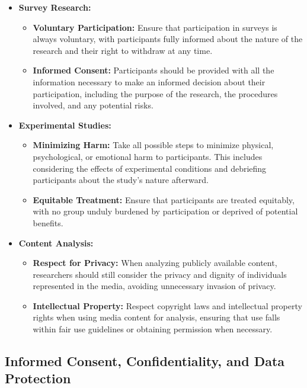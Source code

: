 \documentclass[
]{book}
\providecommand{\tightlist}{%
  \setlength{\itemsep}{0pt}\setlength{\parskip}{0pt}}
\begin{document}
\begin{itemize}
\tightlist
\item
  \textbf{Survey Research:}

  \begin{itemize}
  \tightlist
  \item
    \textbf{Voluntary Participation:} Ensure that participation in surveys is always voluntary, with participants fully informed about the nature of the research and their right to withdraw at any time.
  \item
    \textbf{Informed Consent:} Participants should be provided with all the information necessary to make an informed decision about their participation, including the purpose of the research, the procedures involved, and any potential risks.
  \end{itemize}
\item
  \textbf{Experimental Studies:}

  \begin{itemize}
  \tightlist
  \item
    \textbf{Minimizing Harm:} Take all possible steps to minimize physical, psychological, or emotional harm to participants. This includes considering the effects of experimental conditions and debriefing participants about the study's nature afterward.
  \item
    \textbf{Equitable Treatment:} Ensure that participants are treated equitably, with no group unduly burdened by participation or deprived of potential benefits.
  \end{itemize}
\item
  \textbf{Content Analysis:}

  \begin{itemize}
  \tightlist
  \item
    \textbf{Respect for Privacy:} When analyzing publicly available content, researchers should still consider the privacy and dignity of individuals represented in the media, avoiding unnecessary invasion of privacy.
  \item
    \textbf{Intellectual Property:} Respect copyright laws and intellectual property rights when using media content for analysis, ensuring that use falls within fair use guidelines or obtaining permission when necessary.
  \end{itemize}
\end{itemize}

\hypertarget{informed-consent-confidentiality-and-data-protection}{%
\subsection{Informed Consent, Confidentiality, and Data Protection}\label{informed-consent-confidentiality-and-data-protection}}
\end{document}
